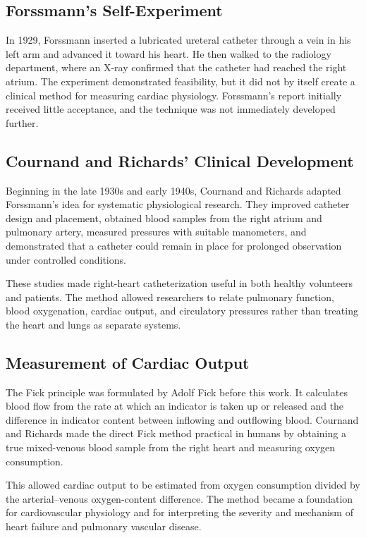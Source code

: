 \subsection{Forssmann's Self-Experiment}

In 1929, Forssmann inserted a lubricated ureteral catheter through a vein in his left arm and advanced it toward his heart. He then walked to the radiology department, where an X-ray confirmed that the catheter had reached the right atrium. The experiment demonstrated feasibility, but it did not by itself create a clinical method for measuring cardiac physiology. Forssmann's report initially received little acceptance, and the technique was not immediately developed further.

\subsection{Cournand and Richards' Clinical Development}

Beginning in the late 1930s and early 1940s, Cournand and Richards adapted Forssmann's idea for systematic physiological research. They improved catheter design and placement, obtained blood samples from the right atrium and pulmonary artery, measured pressures with suitable manometers, and demonstrated that a catheter could remain in place for prolonged observation under controlled conditions.

These studies made right-heart catheterization useful in both healthy volunteers and patients. The method allowed researchers to relate pulmonary function, blood oxygenation, cardiac output, and circulatory pressures rather than treating the heart and lungs as separate systems.

\subsection{Measurement of Cardiac Output}

The Fick principle was formulated by Adolf Fick before this work. It calculates blood flow from the rate at which an indicator is taken up or released and the difference in indicator content between inflowing and outflowing blood. Cournand and Richards made the direct Fick method practical in humans by obtaining a true mixed-venous blood sample from the right heart and measuring oxygen consumption.

This allowed cardiac output to be estimated from oxygen consumption divided by the arterial--venous oxygen-content difference. The method became a foundation for cardiovascular physiology and for interpreting the severity and mechanism of heart failure and pulmonary vascular disease.

